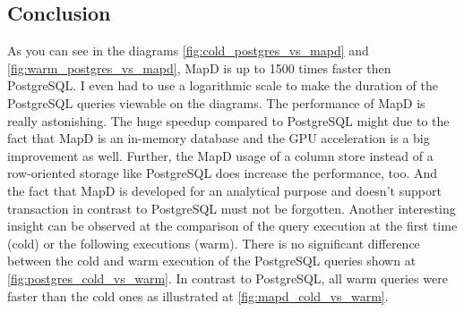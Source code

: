 \subsection{Conclusion}
As you can see in the diagrams \ref{fig:cold_postgres_vs_mapd} and \ref{fig:warm_postgres_vs_mapd}, MapD is up to 1500 times faster then PostgreSQL.
I even had to use a logarithmic scale to make the duration of the PostgreSQL queries viewable on the diagrams.
The performance of MapD is really astonishing.
The huge speedup compared to PostgreSQL might due to the fact that MapD is an in-memory database and the GPU acceleration is a big improvement as well.
Further, the MapD usage of a column store instead of a row-oriented storage like PostgreSQL does increase the performance, too.
And the fact that MapD is developed for an analytical purpose and doesn't support transaction in contrast to PostgreSQL must not be forgotten.
Another interesting insight can be observed at the comparison of the query execution at the first time (cold) or the following executions (warm).
There is no significant difference between the cold and warm execution of the PostgreSQL queries shown at \ref{fig:postgres_cold_vs_warm}.
In contrast to PostgreSQL, all warm queries were faster than the cold ones as illustrated at \ref{fig:mapd_cold_vs_warm}.
